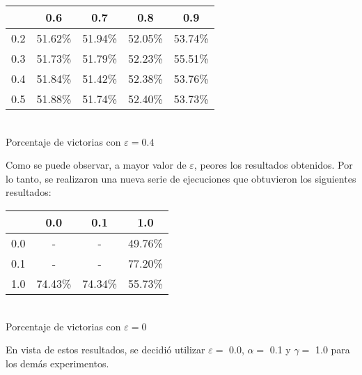 \begin{center}
\begin{tabular}{|c||c|c|c|c|}
	\hline
	\backslashbox{$\alpha$}{$\gamma$} & 0.6 & 0.7 & 0.8 & 0.9\\
	\hline
	\hline
	0.2 & 51.62\% & 51.94\% & 52.05\% & 53.74\% \\
	\hline
	0.3 & 51.73\% & 51.79\% & 52.23\% & 55.51\% \\
	\hline
	0.4 & 51.84\% & 51.42\% & 52.38\% & \cellcolor{intvier}53.76\% \\
	\hline
	0.5 & 51.88\% & 51.74\% & 52.40\% & 53.73\% \\
	\hline
\end{tabular}\\
Porcentaje de victorias con $\varepsilon=0.4$
\end{center}

Como se puede observar, a mayor valor de $\varepsilon$, peores los resultados obtenidos. Por lo tanto, se realizaron una nueva serie de ejecuciones que obtuvieron los siguientes resultados:
\begin{center}
\begin{tabular}{|c||c|c|c|}
	\hline
	\backslashbox{$\alpha$}{$\gamma$} & 0.0 & 0.1 & 1.0\\
	\hline
	\hline
	0.0 & - & - & 49.76\%\\
	\hline
	0.1 & - & - & \cellcolor{intvier}77.20\%\\
	\hline
	1.0 & 74.43\% & 74.34\% & 55.73\%\\
	\hline
\end{tabular}\\
Porcentaje de victorias con $\varepsilon=0$
\end{center}

En vista de estos resultados, se decidi\'o utilizar $\varepsilon = $ 0.0, $\alpha = $ 0.1 y $\gamma = $ 1.0 para los dem\'as experimentos.






